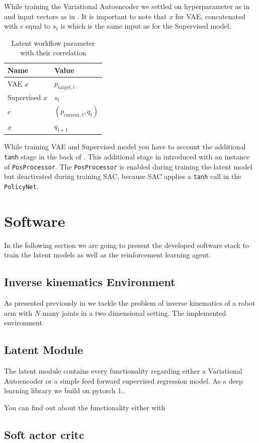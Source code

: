 While training the Variational Autoencoder we settled on hyperparameter as in  and input vectors as in . It is important to note that $x$ for VAE, concatenated with $c$ equal to $s_t$ is which is the same input as for the Supervised model. 
\begin{table}[]
    \centering
    \begin{tabular}{l|l}
        Name & Value \\
        \hline
        VAE $x$ & $p_{\text{target}, t}$ \\
        Supervised $x$ & $s_t$ \\
        $c$ & $(p_{\text{current}, t}, q_t)$ \\
        $\hat{x}$ & $q_{t + 1}$
    \end{tabular}
    \caption[Latent workflow parameter]{Latent workflow parameter with their correlation}
    \label{tab:Latent Parameter}
\end{table}

While training VAE and Supervised model you have to account the additional \texttt{tanh} stage in the back of . This additional stage in introduced with an instance of \texttt{PosProcessor}. The \texttt{PosProcessor} is enabled during training the latent model but deactivated during training SAC, because SAC applies a \texttt{tanh} call in the \texttt{PolicyNet}. 

\section{Software}

In the following section we are going to present the developed software stack to train the latent models as well as the reinforcement learning agent.

\subsection{Inverse kinematics Environment}

As presented previously in  we tackle the problem of inverse kinematics of a robot arm with $N$ many joints in a two dimensional setting. 
The implemented environment

\subsection{Latent Module}

The latent module contains every functionality regarding either a Variational Autoencoder or a simple feed forward supervised regression model.
As a deep learning library we build on pytorch 1.. 

You can find out about the functionality either with 



\subsection{Soft actor critc}
